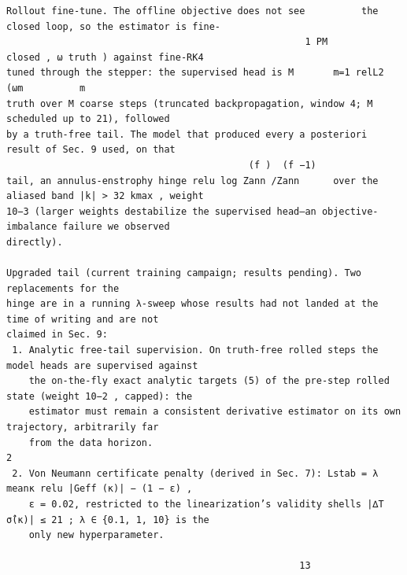 \documentclass[letterpaper]{article}
\begin{document}
\begin{Verbatim}[fontsize=\fontsize{6.35}{7.15}\selectfont,breaklines=false]
Rollout fine-tune. The offline objective does not see          the closed loop, so the estimator is fine-
                                                     1 PM              closed , ω truth ) against fine-RK4
tuned through the stepper: the supervised head is M       m=1 relL2 (ωm          m
truth over M coarse steps (truncated backpropagation, window 4; M scheduled up to 21), followed
by a truth-free tail. The model that produced every a posteriori result of Sec. 9 used, on that
                                           (f )  (f −1) 
tail, an annulus-enstrophy hinge relu log Zann /Zann      over the aliased band |k| > 32 kmax , weight
10−3 (larger weights destabilize the supervised head—an objective-imbalance failure we observed
directly).

Upgraded tail (current training campaign; results pending). Two replacements for the
hinge are in a running λ-sweep whose results had not landed at the time of writing and are not
claimed in Sec. 9:
 1. Analytic free-tail supervision. On truth-free rolled steps the model heads are supervised against
    the on-the-fly exact analytic targets (5) of the pre-step rolled state (weight 10−2 , capped): the
    estimator must remain a consistent derivative estimator on its own trajectory, arbitrarily far
    from the data horizon.                                                                             2
 2. Von Neumann certificate penalty (derived in Sec. 7): Lstab = λ meanκ relu |Geff (κ)| − (1 − ε) ,
    ε = 0.02, restricted to the linearization’s validity shells |∆T σ̂(κ)| ≤ 21 ; λ ∈ {0.1, 1, 10} is the
    only new hyperparameter.

                                                    13
\end{Verbatim}
\newpage
\end{document}
